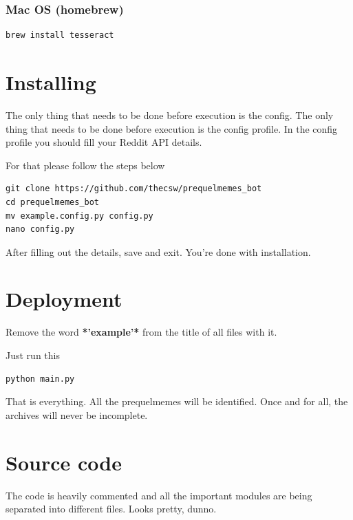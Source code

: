 \documentclass[11pt]{article}
\begin{document}
\subsubsection{Mac OS (homebrew)}
\label{sec-1-2-2}
\begin{verbatim}
brew install tesseract
\end{verbatim}

\section{Installing}
\label{sec-2}

The only thing that needs to be done before execution is the config. The only
thing that needs to be done before execution is the config profile. In the
config profile you should fill your Reddit API details.

For that please follow the steps below

\begin{verbatim}
git clone https://github.com/thecsw/prequelmemes_bot
cd prequelmemes_bot
mv example.config.py config.py
nano config.py
\end{verbatim}

After filling out the details, save and exit. You're done with installation.

\section{Deployment}
\label{sec-3}

Remove the word \textbf{*'example'*} from the title of all files with it.

Just run this

\begin{verbatim}
python main.py
\end{verbatim}

That is everything. All the prequelmemes will be identified. Once and for all,
the archives will never be incomplete.

\section{Source code}
\label{sec-4}

The code is heavily commented and all the important modules are being separated
into different files. Looks pretty, dunno.
\end{document}
